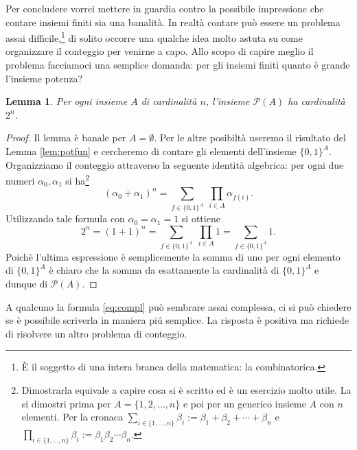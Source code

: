 \documentclass{amsart}
\newtheorem{lem}[thm]{Lemma}
\newcommand\Pa{{\mathcal P}}
\begin{document}
Per concludere vorrei mettere in guardia contro la possibile
impressione che contare insiemi finiti sia una banalit\`a. In realt\`a
contare pu\`o essere un problema assai difficile,\footnote{\`E il
soggetto di una intera branca della matematica: la combinatorica.} di
solito occorre una qualche idea molto astuta su come organizzare il conteggio per
venirne a capo. Allo scopo di capire meglio il problema facciamoci una
semplice domanda: per gli insiemi finiti quanto \`e grande l'insieme potenza?
\begin{lem}\label{lem:potf}
Per ogni insieme $A$ di cardinalit\`a $n$, l'insieme
$\Pa(A)$ ha cardinalit\`a $2^n$.
\end{lem}
\begin{proof}
Il lemma \`e banale per $A=\emptyset$. Per le altre posibilt\`a useremo
il risultato del Lemma \ref{lem:potfun} e cercheremo di contare gli
elementi dell'insieme $\{0,1\}^A$. Organizziamo il conteggio attraverso
la seguente identit\`a algebrica: 
per ogni due numeri $\alpha_0, \alpha_1$ si ha\footnote{Dimostrarla
equivale a capire cosa si \`e scritto ed \`e un esercizio molto
utile. La si dimostri prima per $A=\{1,2,\dots,n\}$ e poi per un
generico insieme $A$ con $n$ elementi. Per la cronaca $\sum\limits_{i\in
\{1,\dots,n\}}\beta_i:=\beta_1+\beta_2 +\cdots+\beta_n$ e $\prod\limits_{i\in
\{1,\dots,n\}}\beta_i:=\beta_1\beta_2 \cdots\beta_n$.}
\begin{equation}\label{eq:compl}
(\alpha_0+\alpha_1)^n=\sum_{f\in\{0,1\}^A}\;\prod_{i\in A}
\alpha_{f(i)}. 
\end{equation}
Utilizzando tale formula con $\alpha_0=\alpha_1=1$ si ottiene
\[
2^n=(1+1)^n=\sum_{f\in\{0,1\}^A}\;\prod_{i\in A} 1
=\sum_{f\in\{0,1\}^A} 1. 
\]
Poich\`e l'ultima espressione \`e semplicemente la somma di uno per
ogni elemento di $\{0,1\}^A$ \`e chiaro che la somma da esattamente la
cardinalit\`a di $\{0,1\}^A$ e dunque di $\Pa(A)$.
\end{proof}

A qualcuno la formula \eqref{eq:compl} pu\`o sembrare assai complessa,
ci si pu\`o chiedere se \`e possibile scriverla in maniera pi\'u
semplice. La risposta \`e positiva ma richiede di risolvere un altro
problema di conteggio.
\end{document}
